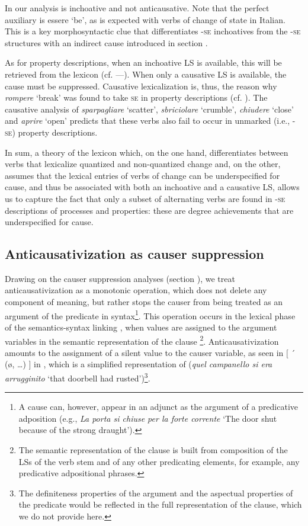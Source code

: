 \documentclass[output=paper,colorlinks,citecolor=brown
]{langscibook}
\begin{document}
In our analysis  is inchoative and not anticausative. Note that the perfect auxiliary is essere ‘be’, as is expected with verbs of change of state in Italian. This is a key morphosyntactic clue that differentiates -\textsc{se} inchoatives from the -\textsc{se} structures with an indirect cause introduced in section . 

As for property descriptions, when an inchoative LS is available, this will be retrieved from the
lexicon (cf. —). When only a causative LS is available, the cause must be suppressed. Causative lexicalization is, thus, the reason why \textit{rompere} ‘break’ was found to take \textsc{se} in property descriptions (cf. ). The causative analysis of \textit{sparpagliare} ‘scatter’, \textit{sbriciolare} ‘crumble’, \textit{chiudere} ‘close’ and \textit{aprire} ‘open’ predicts that these verbs also fail to occur in unmarked (i.e., -\textsc{se}) property descriptions.

In sum, a theory of the lexicon which, on the one hand, differentiates between verbs that lexicalize quantized and non-quantized change and, on the other, assumes that the lexical entries of verbs of change can be underspecified for cause, and thus be associated with both an inchoative and a causative LS, allows us to capture the fact that only a subset of alternating verbs are found in -\textsc{se} descriptions of processes and properties: these are degree achievements that are underspecified for cause.

\subsection{Anticausativization as causer suppression}
\label{bentley_section_5.4}

Drawing on the causer suppression analyses (section ), we treat anticausativization as a monotonic
operation, which does not delete any component of meaning, but rather stops the causer from being
treated as an argument of the predicate in syntax\footnote{A cause can, however, appear in an
  adjunct as the argument of a predicative adposition (e.g., \textit{La porta si chiuse per la forte
    corrente} ‘The door shut because of the strong draught’). }.  This operation occurs in the
lexical phase of the semantics-syntax linking \citep[116—125]{vanvalin2023principles}, when values
are assigned to the argument variables in the semantic representation of the clause \footnote{The
  semantic representation of the clause is built from composition of the LSs of the verb stem and of
  any other predicating elements, for example, any predicative adpositional
  phrases.}. Anticausativization amounts to the assignment of a silent value to the causer variable,
as seen in $\lbrack$ ´ (\o,  \ldots ) $\rbrack$ in , which is a simplified representation of  (\textit{quel campanello si era arrugginito} ‘that doorbell had rusted’)\footnote{The definiteness properties of the argument and the aspectual properties of the predicate would be reflected in the full representation of the clause, which we do not provide here.}.
\end{document}
